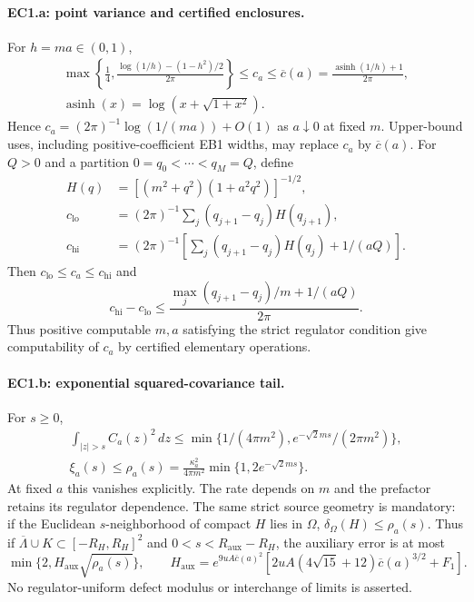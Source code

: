 \paragraph{EC1.a: point variance and certified enclosures.}
For $h=ma\in(0,1)$,
\begin{gather*}
 \max\left\{\frac14,\frac{\log(1/h)-(1-h^2)/2}{2\pi}\right\}
 \le c_a\le\overline c(a)=\frac{\operatorname{asinh}(1/h)+1}{2\pi},\\
 \operatorname{asinh}(x)=\log(x+\sqrt{1+x^2}).
\end{gather*}
Hence $c_a=(2\pi)^{-1}\log(1/(ma))+O(1)$ as $a\downarrow0$ at fixed
$m$. Upper-bound uses, including positive-coefficient EB1 widths, may
replace $c_a$ by $\overline c(a)$. For $Q>0$ and a partition
$0=q_0<\cdots<q_M=Q$, define
\begin{align*}
 H(q)&=[(m^2+q^2)(1+a^2q^2)]^{-1/2},\\
 c_{\mathrm{lo}}&=(2\pi)^{-1}\sum_j(q_{j+1}-q_j)H(q_{j+1}),\\
 c_{\mathrm{hi}}&=(2\pi)^{-1}
 \left[\sum_j(q_{j+1}-q_j)H(q_j)+1/(aQ)\right].
\end{align*}
Then $c_{\mathrm{lo}}\le c_a\le c_{\mathrm{hi}}$ and
\[
 c_{\mathrm{hi}}-c_{\mathrm{lo}}
 \le\frac{\max_j(q_{j+1}-q_j)/m+1/(aQ)}{2\pi}.
\]
Thus positive computable $m,a$ satisfying the strict regulator condition
give computability of $c_a$ by certified elementary operations.

\paragraph{EC1.b: exponential squared-covariance tail.}
For $s\ge0$,
\begin{gather*}
 \int_{|z|>s}C_a(z)^2\,dz
 \le\min\{1/(4\pi m^2),e^{-\sqrt2ms}/(2\pi m^2)\},\\
 \xi_a(s)\le\rho_a(s)=\frac{\kappa_a^2}{4\pi m^2}
                         \min\{1,2e^{-\sqrt2ms}\}.
\end{gather*}
At fixed $a$ this vanishes explicitly. The rate depends on $m$ and the
prefactor retains its regulator dependence. The same strict source geometry
is mandatory: if the Euclidean $s$-neighborhood of compact $H$ lies in
$\Omega$, $\delta_\Omega(H)\le\rho_a(s)$. Thus if
$\overline\Lambda\cup K\subset[-R_H,R_H]^2$ and
$0<s<R_{\mathrm{aux}}-R_H$, the auxiliary error is at most
\[
 \min\{2,H_{\mathrm{aux}}\sqrt{\rho_a(s)}\},\qquad
 H_{\mathrm{aux}}=e^{9uA\overline c(a)^2}
 [2uA(4\sqrt{15}+12)\overline c(a)^{3/2}+F_1].
\]
No regulator-uniform defect modulus or interchange of limits is asserted.

